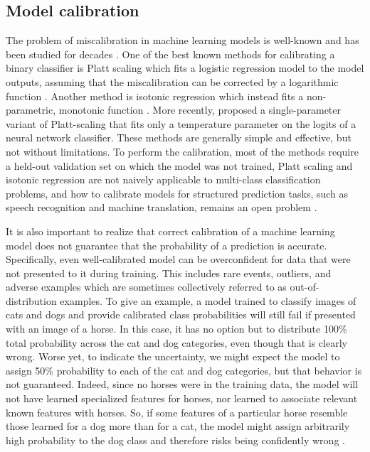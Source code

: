 \subsection{Model calibration} \label{subsec:model-calibration}
% 
The problem of miscalibration in machine learning models is well-known and has been studied for decades \parencite{lewis_sequential_1995, platt_probabilistic_1999, garczarek_classification_2002, zadrozny_transforming_2002, bennett_using_2003, niculescu-mizil_predicting_2005}. One of the best known methods for calibrating a binary classifier is Platt scaling which fits a logistic regression model to the model outputs, assuming that the miscalibration can be corrected by a logarithmic function \parencite{platt_probabilistic_1999}. Another method is isotonic regression which instead fits a non-parametric, monotonic function \parencite{zadrozny_transforming_2002}. 
More recently, \textcite{guo_calibration_2017} proposed a single-parameter variant of Platt-scaling that fits only a temperature parameter on the logits of a neural network classifier. 
These methods are generally simple and effective, but not without limitations. 
To perform the calibration, most of the methods require a held-out validation set on which the model was not trained, Platt scaling and isotonic regression are not naively applicable to multi-class classification problems, and how to calibrate models for structured prediction tasks, such as speech recognition and machine translation, remains an open problem \parencite{astudillo_uncertainty_2010, astudillo_integration_2013, jayashankar_detecting_2020}.

It is also important to realize that correct calibration of a machine learning model does not guarantee that the probability of a prediction is accurate. 
Specifically, even well-calibrated model can be overconfident for data that were not presented to it during training. This includes rare events, outliers, and adverse examples which are sometimes collectively referred to as out-of-distribution examples. 
To give an example, a model trained to classify images of cats and dogs and provide calibrated class probabilities will still fail if presented with an image of a horse. In this case, it has no option but to distribute 100\% total probability across the cat and dog categories, even though that is clearly wrong. 
Worse yet, to indicate the uncertainty, we might expect the model to assign 50\% probability to each of the cat and dog categories, but that behavior is not guaranteed. Indeed, since no horses were in the training data, the model will not have learned specialized features for horses, nor learned to associate relevant known features with horses. So, if some features of a particular horse resemble those learned for a dog more than for a cat, the model might assign arbitrarily high probability to the dog class and therefore risks being confidently wrong \parencite{zhou_survey_2022}. 


